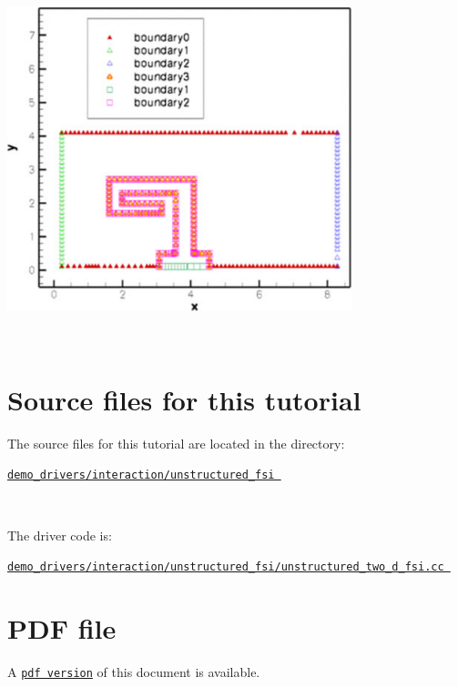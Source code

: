 \begin{DoxyItemize}
\begin{DoxyImage}
\includegraphics[width=0.75\textwidth]{boundaries}
\end{DoxyImage}
 ~\newline

\end{DoxyItemize}



 

\hypertarget{index_sources}{}\section{Source files for this tutorial}\label{index_sources}

\begin{DoxyItemize}
\item The source files for this tutorial are located in the directory\+:~\newline
~\newline
\begin{center} \href{../../../../demo_drivers/interaction/unstructured_fsi}{\tt demo\+\_\+drivers/interaction/unstructured\+\_\+fsi } \end{center} ~\newline

\item The driver code is\+: ~\newline
~\newline
\begin{center} \href{../../../../demo_drivers/interaction/unstructured_fsi/unstructured_two_d_fsi.cc}{\tt demo\+\_\+drivers/interaction/unstructured\+\_\+fsi/unstructured\+\_\+two\+\_\+d\+\_\+fsi.\+cc } \end{center} 
\end{DoxyItemize}



 

 \hypertarget{index_pdf}{}\section{P\+D\+F file}\label{index_pdf}
A \href{../latex/refman.pdf}{\tt pdf version} of this document is available. 
